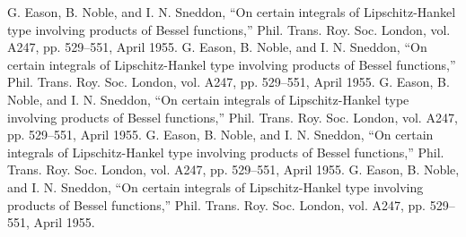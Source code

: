 \documentclass[10pt, conference]{IEEEtran}
\begin{document}
\begin{thebibliography}{00}
 G. Eason, B. Noble, and I. N. Sneddon, ``On certain integrals of Lipschitz-Hankel type involving products of Bessel functions,'' Phil. Trans. Roy. Soc. London, vol. A247, pp. 529--551, April 1955.
 G. Eason, B. Noble, and I. N. Sneddon, ``On certain integrals of Lipschitz-Hankel type involving products of Bessel functions,'' Phil. Trans. Roy. Soc. London, vol. A247, pp. 529--551, April 1955.
 G. Eason, B. Noble, and I. N. Sneddon, ``On certain integrals of Lipschitz-Hankel type involving products of Bessel functions,'' Phil. Trans. Roy. Soc. London, vol. A247, pp. 529--551, April 1955.
 G. Eason, B. Noble, and I. N. Sneddon, ``On certain integrals of Lipschitz-Hankel type involving products of Bessel functions,'' Phil. Trans. Roy. Soc. London, vol. A247, pp. 529--551, April 1955.
 G. Eason, B. Noble, and I. N. Sneddon, ``On certain integrals of Lipschitz-Hankel type involving products of Bessel functions,'' Phil. Trans. Roy. Soc. London, vol. A247, pp. 529--551, April 1955.
\end{thebibliography}

\end{document}
